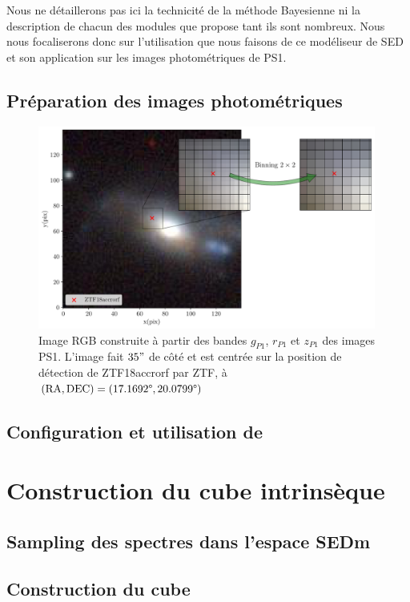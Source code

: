 \documentclass[../main/main.tex]{subfiles}
\begin{document}
Nous ne détaillerons pas ici la technicité de la méthode Bayesienne ni
la description de chacun des modules que propose  tant ils
sont nombreux. Nous nous focaliserons donc sur l'utilisation que nous faisons
de ce modéliseur de SED et son application sur les images photométriques
de PS1.

\subsection{Préparation des images photométriques}
\label{ssec:preprocessimages}


\begin{figure}
  \centering
  \includegraphics[width=0.99\textwidth]{../figures/05_sedfit/ps_cutouts_ZTF18accrorf_binned.pdf}
  \caption[Illustration binning $2\times2$ sur les images PS1.]{Image RGB
      construite à partir des bandes $g_{P1}$, $r_{P1}$ et
      $z_{P1}$ des images PS1. L'image fait $35"$ de côté et est centrée sur la position de
      détection de ZTF18accrorf par ZTF, à $(\text{RA}, \text{DEC})=(17.1692\degree,20.0799\degree)$}
  \label{fig:pscutoutsZTF18accrorf_binned}
\end{figure}

\subsection{Configuration et utilisation de }
\label{ssec:cigaleconfig}


\section{Construction du cube intrinsèque}

\subsection{Sampling des spectres dans l'espace SEDm}

\subsection{Construction du cube}



\end{document}
